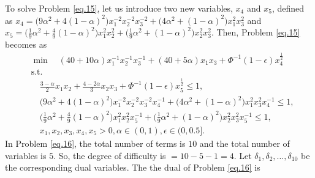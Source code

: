 To solve Problem \ref{eq.15}, let us introduce two new variables, $x_4$ and $x_5$, defined as
 $x_4=\big(9\alpha^2+4(1-\alpha)^2\big) x_1^{-2} x_2^{-2}x_3^{-2}+\big(4\alpha^2+(1-\alpha)^2\big)x_1^2 x_3^2$ and $x_5=\big(\frac{1}{9}\alpha^2+\frac{4}{9}(1-\alpha)^2\big)x_1^2 x_2^2+\big(\frac{1}{9}\alpha^2+(1-\alpha)^2\big)x_2^2 x_3^2$. Then, Problem \ref{eq.15} becomes as 
\begin{equation}\label{eq.16}
	\begin{aligned}
		&	\min\quad (40+10\alpha) x_1^{-1} x_2^{-1}x_3^{-1}+(40+5\alpha)x_1 x_3+\Phi^{-1}(1-\epsilon)x_4^{\frac{1}{2}}\\
		&	\text{s.t.} \\
		&\quad  \frac{3-\alpha}{2}x_1 x_2+\frac{4-2\alpha}{3}x_2 x_3+\Phi^{-1}(1-\epsilon)x_5^{\frac{1}{2}}\leq 1,\\
		& \quad \big(9\alpha^2+4(1-\alpha)^2\big) x_1^{-2} x_2^{-2}x_3^{-2}x_4^{-1}+\big(4\alpha^2+(1-\alpha)^2\big)x_1^2 x_3^2x_4^{-1}\le1,\\
		& \quad \bigg(\frac{1}{9}\alpha^2+\frac{4}{9}(1-\alpha)^2\bigg)x_1^2 x_2^2x_5^{-1}+\bigg(\frac{1}{9}\alpha^2+(1-\alpha)^2\bigg)x_2^2 x_3^2x_5^{-1}\le 1,\\
		&\quad	x_1,x_2,x_3,x_4,x_5>0, \alpha\in(0,1), \epsilon \in (0,0.5].
	\end{aligned}
\end{equation}
In Problem \ref{eq.16}, the total number of terms is $10$ and the total number of variables is $5.$ So, the degree of difficulty is $=10-5-1=4.$ Let $\delta_1,\delta_2,\ldots,\delta_{10}$ be the corresponding dual variables. The the dual of Problem \ref{eq.16} is

